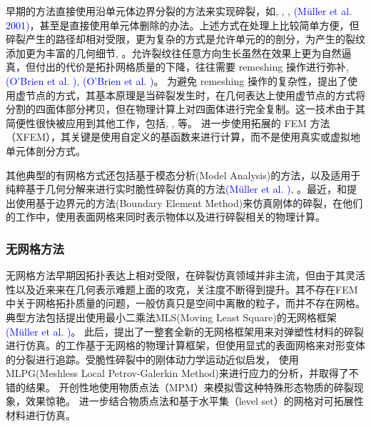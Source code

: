 早期的方法直接使用沿单元体边界分裂的方法来实现碎裂，如, , , \textcolor{blue}{(M\"{u}ller et al. 2001)\parencite{Muller2001}}，甚至是直接使用单元体删除的办法。上述方式在处理上比较简单方便，但碎裂产生的路径却相对受限，更为复杂的方式是允许单元的的剖分，为产生的裂纹添加更为丰富的几何细节, 。允许裂纹往任意方向生长虽然在效果上更为自然逼真，但付出的代价是拓扑网格质量的下降，往往需要 remeshing 操作进行弥补, \textcolor{blue}{(O'Brien et al. )\parencite{OBrien1999}}, \textcolor{blue}{(O'Brien et al. )\parencite{OBrien2002}}。 为避免 remeshing 操作的复杂性，提出了使用虚节点的方式，其基本原理是当碎裂发生时，在几何表达上使用虚节点的方式将分割的四面体部分拷贝，但在物理计算上对四面体进行完全复制。这一技术由于其简便性很快被应用到其他工作，包括, , 等。 进一步使用拓展的 FEM 方法（XFEM），其关键是使用自定义的基函数来进行计算，而不是使用真实或虚拟地单元体剖分方式。

其他典型的有网格方式还包括基于模态分析(Model Analysis)的方法，以及适用于纯粹基于几何分解来进行实时脆性碎裂仿真的方法\textcolor{blue}{(M\"{u}ller et al. )\parencite{Muller2013}}, 。最近，和提出使用基于边界元的方法(Boundary Element Method)来仿真刚体的碎裂，在他们的工作中，使用表面网格来同时表示物体以及进行碎裂相关的物理计算。

\subsubsection{无网格方法}

无网格方法早期因拓扑表达上相对受限，在碎裂仿真领域并非主流，但由于其灵活性以及近来来在几何表示难题上面的攻克，关注度不断得到提升。其不存在FEM 中关于网格拓扑质量的问题，一般仿真只是空间中离散的粒子，而并不存在网格。典型方法包括提出使用最小二乘法MLS(Moving Least Square)的无网格框架\textcolor{blue}{(M\"{u}ller et al. )\parencite{Muller2004}}。 此后，提出了一整套全新的无网格框架用来对弹塑性材料的碎裂进行仿真。的工作基于无网格的物理计算框架，但使用显式的表面网格来对形变体的分裂进行追踪。受脆性碎裂中的刚体动力学运动近似启发，
使用MLPG(Meshless Local Petrov-Galerkin Method)来进行应力的分析，并取得了不错的结果。
开创性地使用物质点法（MPM）来模拟雪这种特殊形态物质的碎裂现象，效果惊艳。
进一步结合物质点法和基于水平集（level set）的网格对可拓展性材料进行仿真。

